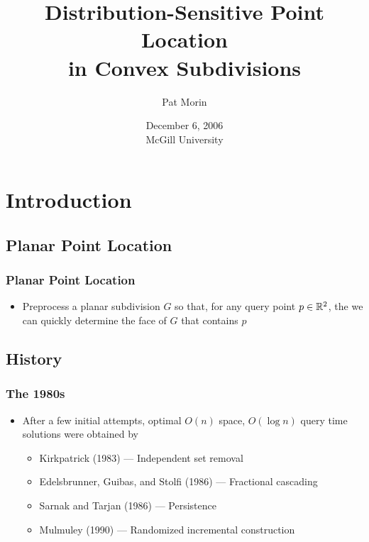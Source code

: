 \documentclass{beamer}
\title{Distribution-Sensitive Point Location\\ in Convex Subdivisions}
\author{Pat Morin}
\institute{Carleton University}
\date{December 6, 2006 \\ McGill University}
\begin{document}
\frame{\titlepage}

\section[Outline]{}
\frame{\tableofcontents}

\section{Introduction}
\subsection{Planar Point Location}
\frame
{
  \frametitle{Planar Point Location}
  \begin{itemize}
  \item Preprocess a planar subdivision $G$ so that, for any query
point $p\in\mathbb{R}^2$, the we can quickly determine the face of $G$
that contains $p$
  \begin{center}
  \end{center}
  \end{itemize}
}

\subsection{History}

\frame
{
  \frametitle{The 1980s}
  \begin{itemize}
  \item<1-> After a few initial attempts, optimal $O(n)$ space, $O(\log
n)$ query time solutions were obtained by
  \begin{itemize}
   \item<2-> Kirkpatrick (1983) --- Independent set removal
   \item<3-> Edelsbrunner, Guibas, and Stolfi (1986) --- Fractional cascading
   \item<4-> Sarnak and Tarjan (1986) --- Persistence
   \item<5-> Mulmuley (1990) --- Randomized incremental construction
  \end{itemize}
  \end{itemize}
}
\end{document}

